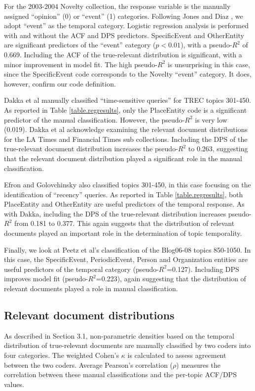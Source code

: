 \documentclass[runningheads,a4paper]{llncs}
\begin{document}
For the 2003-2004 Novelty collection, the response variable is the manually assigned ``opinion'' (0) or ``event'' (1) categories.  Following Jones and Diaz \cite{Jones2007}, we adopt ``event'' as the temporal category. Logistic regression analysis is performed with and without the ACF and DPS predictors.  SpecificEvent and OtherEntity are significant predictors of the ``event'' category ($p < 0.01$), with a pseudo-$R^2$ of 0.669. Including the ACF of the true-relevant distribution is significant, with a minor improvement in model fit. The high pseudo-$R^2$ is unsurprising in this case, since the SpecificEvent code corresponds to the Novelty ``event'' category. It does, however, confirm our code definition.

Dakka et al manually classified ``time-sensitive queries'' for TREC topics 301-450. As reported in Table \ref{table.regresults}, only the PlaceEntity code is a significant predictor of the manual classification. However, the pseudo-$R^2$ is very low (0.019).  Dakka et al acknowledge examining the relevant document distributions for the LA Times and Financial Times sub collections.  Including the DPS of the true-relevant document distribution increases the pseudo-$R^2$ to 0.263, suggesting that the relevant document distribution played a significant role in the manual classification.

Efron and Golovchinsky also classified topics 301-450, in this case focusing on the identification of ``recency'' queries. As reported in Table \ref{table.regresults}, both PlaceEntity and OtherEntity are useful predictors of the temporal response. As with Dakka, including the DPS of the true-relevant distribution increases pseudo-$R^2$ from 0.181 to 0.377. This again suggests that the distribution of relevant documents played an important role in the determination of topic temporality.

Finally, we look at Peetz et al's classification of the Blog06-08 topics 850-1050. In this case, the SpecificEvent, PeriodicEvent, Person and Organization entities are useful predictors of the temporal category (pseudo-$R^2$=0.127). Including DPS  improves model fit (pseudo-$R^2$=0.223), again suggesting that the distribution of relevant documents played a role in manual classification.

\subsection{Relevant document distributions}

As described in Section 3.1, non-parametric densities based on the temporal distribution of true-relevant documents are manually classified by two coders into four categories.  The weighted Cohen's $\kappa$ is calculated to assess agreement between the two coders.  Average Pearson's correlation ($\rho$) measures the correlation between these manual classifications and the per-topic ACF/DPS values.  
\end{document}
